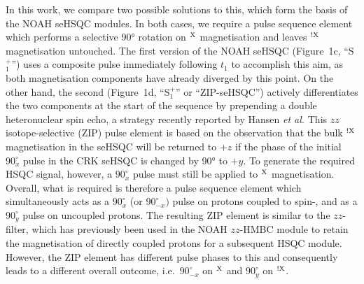 \documentclass[final,twocolumn]{elsarticle}
\newcommand*{\noahSpa}{S$^+_1$}
\newcommand*{\proton}{\ce{^{1}H}}
\newcommand*{\magn}[1]{\ce{^1H}$^{#1}$}
\newcommand*{\magnnot}[1]{\ce{^1H}$^{!#1}$}
\begin{document}
In this work, we compare two possible solutions to this, which form the basis of the NOAH seHSQC modules.
In both cases, we require a pulse sequence element which performs a selective \ang{90} rotation on \magn{\ce{X}} magnetisation and leaves \magnnot{\ce{X}} magnetisation untouched.
The first version of the NOAH seHSQC (Figure~1c, ``\noahSpa'') uses a composite \proton{} pulse immediately following $t_1$ to accomplish this aim, as both magnetisation components have already diverged by this point.
On the other hand, the second (Figure~1d, ``\noahSpa'' or ``ZIP-seHSQC'') actively differentiates the two components at the start of the sequence by prepending a double heteronuclear spin echo, a strategy recently reported by Hansen \textit{et al.}\cite{Hansen2021AC}
This $zz$ isotope-selective (ZIP) pulse element is based on the observation that the bulk \magnnot{\ce{X}} magnetisation in the seHSQC will be returned to $+z$ if the phase of the initial \proton{} $90^\circ_{x}$ pulse in the CRK seHSQC is changed by \ang{90} to $+y$.
To generate the required HSQC signal, however, a \proton{} $90^\circ_x$ pulse must still be applied to \magn{\ce{X}} magnetisation.
Overall, what is required is therefore a pulse sequence element which simultaneously acts as a $90^\circ_x$ (or $90^\circ_{-x})$ pulse on protons coupled to spin-, and as a $90^\circ_y$ pulse on uncoupled protons.
The resulting ZIP element is similar to the $zz$-filter, which has previously been used in the NOAH $zz$-HMBC module to retain the magnetisation of directly coupled protons for a subsequent HSQC module.\cite{Kupce2018CC, Kupce2019JMR}
However, the ZIP element has different pulse phases to this and consequently leads to a different overall outcome, i.e.\ $90^\circ_{-x}$ on \magn{\ce{X}} and $90^\circ_y$ on \magnnot{\ce{X}}.
\end{document}
